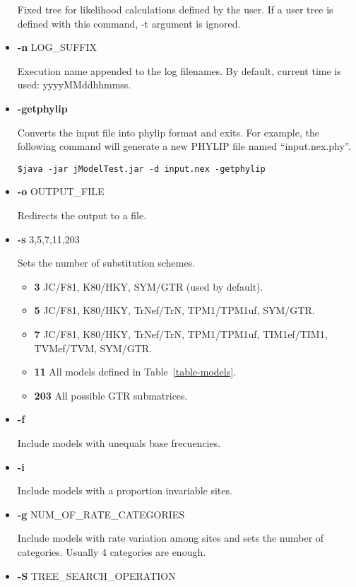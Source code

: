 \documentclass[11pt,twoside,a4paper]{article}
\begin{document}
\begin{itemize}
Fixed tree for likelihood calculations defined by the user. If a user tree is defined with this command, -t argument is ignored.

\item  {\bf -n} LOG\_SUFFIX

Execution name appended to the log filenames. By default, current time is used: yyyyMMddhhmmss.

\item  {\bf -getphylip}

Converts the input file into phylip format and exits. For example, the following command will generate a new PHYLIP file named ``input.nex.phy''.
\begin{lstlisting}
$java -jar jModelTest.jar -d input.nex -getphylip
\end{lstlisting}

\item  {\bf -o} OUTPUT\_FILE

Redirects the output to a file.

\item  {\bf -s} {3,5,7,11,203}

Sets the number of substitution schemes.
\begin{itemize}
     \item {\bf 3} JC/F81, K80/HKY, SYM/GTR (used by default).
     \item {\bf 5} JC/F81, K80/HKY, TrNef/TrN, TPM1/TPM1uf, SYM/GTR.
     \item {\bf 7} JC/F81, K80/HKY, TrNef/TrN, TPM1/TPM1uf, TIM1ef/TIM1, TVMef/TVM, SYM/GTR.
     \item {\bf 11} All models defined in Table~\ref{table-models}.
     \item {\bf 203} All possible GTR submatrices.
\end{itemize}

\item  {\bf -f}

Include models with unequals base frecuencies.

\item  {\bf -i}

Include models with a proportion invariable sites.

\item  {\bf -g} NUM\_OF\_RATE\_CATEGORIES

Include models with rate variation among sites and sets the number of categories. Usually 4 categories are enough.

\item  {\bf -S} TREE\_SEARCH\_OPERATION


\end{itemize}
\end{document}

